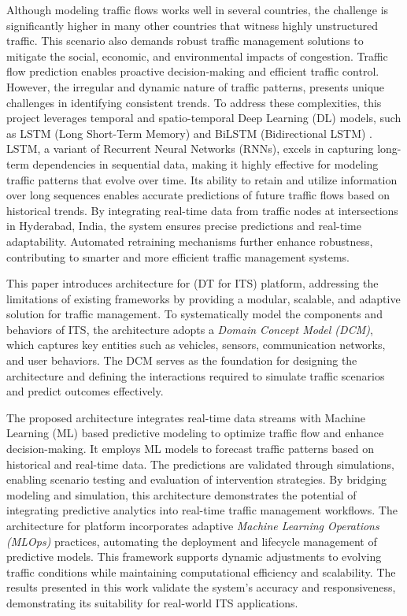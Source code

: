 Although modeling traffic flows works well in several countries, the challenge is significantly higher in many other countries that witness highly unstructured traffic. This scenario also demands robust traffic management solutions to mitigate the social, economic, and environmental impacts of congestion. Traffic flow prediction enables proactive decision-making and efficient traffic control. However, the irregular and dynamic nature of traffic patterns, presents unique challenges in identifying consistent trends. To address these complexities, this project leverages temporal and spatio-temporal Deep Learning (DL) models, such as LSTM (Long Short-Term Memory) \cite{lstmbase} and BiLSTM (Bidirectional LSTM) \cite{bilstm}. LSTM, a variant of Recurrent Neural Networks (RNNs), excels in capturing long-term dependencies in sequential data, making it highly effective for modeling traffic patterns that evolve over time. Its ability to retain and utilize information over long sequences enables accurate predictions of future traffic flows based on historical trends. By integrating real-time data from traffic nodes at intersections in Hyderabad, India, the system ensures precise predictions and real-time adaptability. Automated retraining mechanisms further enhance robustness, contributing to smarter and more efficient traffic management systems.


This paper introduces architecture for \digit (DT for ITS) platform, addressing the limitations of existing frameworks by providing a modular, scalable, and adaptive solution for traffic management. To systematically model the components and behaviors of ITS, the architecture adopts a \textit{Domain Concept Model (DCM)}, which captures key entities such as vehicles, sensors, communication networks, and user behaviors. The DCM serves as the foundation for designing the architecture and defining the interactions required to simulate traffic scenarios and predict outcomes effectively.  

The proposed architecture integrates real-time data streams with Machine Learning (ML) based predictive modeling to optimize traffic flow and enhance decision-making. It employs ML models to forecast traffic patterns based on historical and real-time data. The predictions are validated through simulations, enabling scenario testing and evaluation of intervention strategies. By bridging modeling and simulation, this architecture demonstrates the potential of integrating predictive analytics into real-time traffic management workflows. The architecture for \digit platform incorporates adaptive \textit{Machine Learning Operations (MLOps)} \cite{symeonidis} practices, automating the deployment and lifecycle management of predictive models. This framework supports dynamic adjustments to evolving traffic conditions while maintaining computational efficiency and scalability. The results presented in this work validate the system’s accuracy and responsiveness, demonstrating its suitability for real-world ITS applications.  

